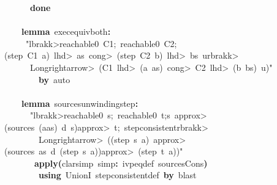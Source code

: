 \documentclass{article}
\newcommand{\syntaxKEYWORDA}[1]{\textcolor[rgb]{0.0,0.4,0.6}{\textbf{#1}}}
\newcommand{\syntaxLITERALA}[1]{\textcolor[rgb]{1.0,0.0,0.8}{#1}}
\newcommand{\syntaxOPERATOR}[1]{\textcolor[rgb]{0.0,0.0,0.0}{\textbf{#1}}}
\newcommand{\syntaxKEYWORDA}[1]{\textcolor[rgb]{0.0,0.4,0.6}{\textbf{#1}}}
\newcommand{\syntaxLITERALA}[1]{\textcolor[rgb]{1.0,0.0,0.8}{#1}}
\newcommand{\syntaxOPERATOR}[1]{\textcolor[rgb]{0.0,0.0,0.0}{\textbf{#1}}}
\newcommand{\syntaxKEYWORDA}[1]{\textcolor[rgb]{0.0,0.4,0.6}{\textbf{#1}}}
\newcommand{\syntaxLITERALA}[1]{\textcolor[rgb]{1.0,0.0,0.8}{#1}}
\newcommand{\syntaxOPERATOR}[1]{\textcolor[rgb]{0.0,0.0,0.0}{\textbf{#1}}}
\newcommand{\syntaxKEYWORDA}[1]{\textcolor[rgb]{0.0,0.4,0.6}{#1}}
\newcommand{\syntaxLITERALA}[1]{\textcolor[rgb]{1.0,0.0,0.8}{\textbf{#1}}}
\newcommand{\syntaxOPERATOR}[1]{\textcolor[rgb]{0.0,0.0,0.0}{#1}}
\newcommand{\syntaxKEYWORDA}[1]{\textcolor[rgb]{0.0,0.4,0.6}{\textbf{#1}}}
\newcommand{\syntaxLITERALA}[1]{\textcolor[rgb]{1.0,0.0,0.8}{#1}}
\newcommand{\syntaxOPERATOR}[1]{\textcolor[rgb]{0.0,0.0,0.0}{\textbf{#1}}}
\newcommand{\syntaxKEYWORDA}[1]{\textcolor[rgb]{0.0,0.4,0.6}{\textbf{#1}}}
\newcommand{\syntaxLITERALA}[1]{\textcolor[rgb]{1.0,0.0,0.8}{#1}}
\newcommand{\syntaxOPERATOR}[1]{\textcolor[rgb]{0.0,0.0,0.0}{\textbf{#1}}}
\begin{document}
{\ }{\ }{\ }{\ }{\ }{\ }\syntaxKEYWORDA{done}\hspace*{\fill}\\
\hspace*{\fill}\\
{\ }{\ }{\ }{\ }\syntaxKEYWORDA{lemma}{\ }exec\usebox{\underscorebox}equiv\usebox{\underscorebox}both\syntaxOPERATOR{:}\hspace*{\fill}\\
{\ }{\ }{\ }{\ }{\ }\syntaxLITERALA{"\<lbrakk>reachable0{\ }C1;{\ }reachable0{\ }C2;(step{\ }C1{\ }a){\ }\<lhd>{\ }as{\ }\<cong>{\ }(step{\ }C2{\ }b){\ }\<lhd>{\ }bs{\ }\usebox{\atbox}{\ }u\<rbrakk>{\ }}\hspace*{\fill}\\
\syntaxLITERALA{{\ }{\ }{\ }{\ }{\ }{\ }\<Longrightarrow>{\ }(C1{\ }\<lhd>{\ }(a{\ }\usebox{\hashbox}{\ }as){\ }\<cong>{\ }C2{\ }\<lhd>{\ }(b{\ }\usebox{\hashbox}{\ }bs){\ }\usebox{\atbox}{\ }u)"}\hspace*{\fill}\\
{\ }{\ }{\ }{\ }{\ }{\ }{\ }{\ }\syntaxKEYWORDA{by}{\ }auto\hspace*{\fill}\\
\hspace*{\fill}\\
{\ }{\ }{\ }{\ }\syntaxKEYWORDA{lemma}{\ }sources\usebox{\underscorebox}unwinding\usebox{\underscorebox}step\syntaxOPERATOR{:}\hspace*{\fill}\\
{\ }{\ }{\ }{\ }{\ }{\ }\syntaxLITERALA{"\<lbrakk>reachable0{\ }s;{\ }reachable0{\ }t;s{\ }\<approx>(sources{\ }(a\usebox{\hashbox}as){\ }d{\ }s)\<approx>{\ }t;{\ }step\usebox{\underscorebox}consistent\<rbrakk>{\ }{\ }}\hspace*{\fill}\\
\syntaxLITERALA{{\ }{\ }{\ }{\ }{\ }{\ }{\ }{\ }\<Longrightarrow>{\ }((step{\ }s{\ }a){\ }\<approx>(sources{\ }as{\ }d{\ }(step{\ }s{\ }a))\<approx>{\ }(step{\ }t{\ }a))"}\hspace*{\fill}\\
{\ }{\ }{\ }{\ }{\ }{\ }{\ }\syntaxKEYWORDA{apply}\syntaxOPERATOR{(}clarsimp{\ }simp\syntaxOPERATOR{:}{\ }ivpeq\usebox{\underscorebox}def{\ }sources\usebox{\underscorebox}Cons\syntaxOPERATOR{)}{\ }{\ }{\ }{\ }{\ }{\ }{\ }{\ }\hspace*{\fill}\\
{\ }{\ }{\ }{\ }{\ }{\ }{\ }{\ }\syntaxKEYWORDA{using}{\ }UnionI{\ }step\usebox{\underscorebox}consistent\usebox{\underscorebox}def{\ }\syntaxKEYWORDA{by}{\ }blast\hspace*{\fill}\\
\end{document}
